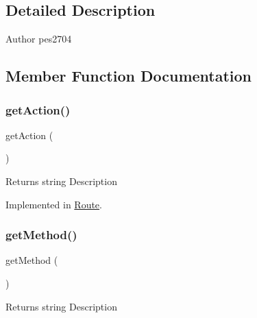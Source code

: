\subsection{Detailed Description}
\begin{DoxyAuthor}{Author}
pes2704 
\end{DoxyAuthor}


\subsection{Member Function Documentation}
\mbox{\label{interface_pes_1_1_router_1_1_route_interface_a189a4abe5faf11f4320d5d3f1d3d1715}} 
\subsubsection{\texorpdfstring{get\+Action()}{getAction()}}
{\footnotesize\ttfamily get\+Action (\begin{DoxyParamCaption}{ }\end{DoxyParamCaption})}

\begin{DoxyReturn}{Returns}
string Description 
\end{DoxyReturn}


Implemented in \mbox{\hyperlink{class_pes_1_1_router_1_1_route_a189a4abe5faf11f4320d5d3f1d3d1715}{Route}}.

\mbox{\label{interface_pes_1_1_router_1_1_route_interface_af3e37e1a6ed9b8c87f86f659873a83b7}} 
\subsubsection{\texorpdfstring{get\+Method()}{getMethod()}}
{\footnotesize\ttfamily get\+Method (\begin{DoxyParamCaption}{ }\end{DoxyParamCaption})}

\begin{DoxyReturn}{Returns}
string Description 
\end{DoxyReturn}


